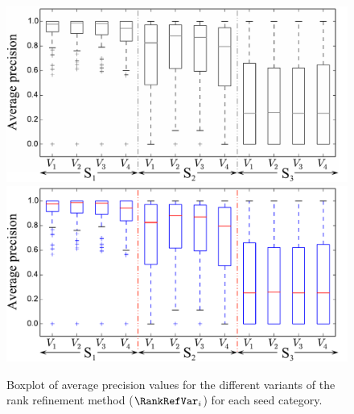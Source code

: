 \begin{figure}
	\begin{center}
		\ifdefined\PRINTVER
			\includegraphics[width=\figSizeNinety]{ch06_patterns/figures/discovery/boxPlot_BW.pdf}
		\else
			\includegraphics[width=\figSizeNinety]{ch06_patterns/figures/discovery/boxPlot.pdf}
		\fi
	\end{center}
	\caption[Boxplot of average precision values for the different variants of the rank refinement method]{Boxplot of average precision values for the different variants of the rank refinement method ($\RankRefVar_i$) for each seed category.}
	\label{fig:boxPlotMAPPatternDiscovery}
\end{figure}


